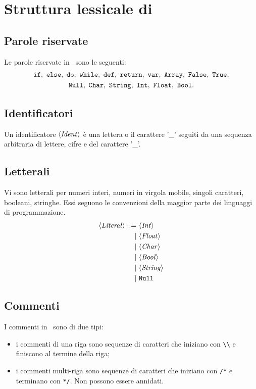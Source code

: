 \section{Struttura lessicale di \SBF}

\subsection*{Parole riservate}
Le parole riservate in \SBF\ sono le seguenti:
\begin{gather*}
\If,\ \Else,\ \Do,\ \While,\ \Def,\ \Return,\ \Var,\ \texttt{Array},\ \False,\ \True,\\
\texttt{Null},\ \texttt{Char},\ \texttt{String},\ \texttt{Int},\ \texttt{Float},\ \texttt{Bool}.
\end{gather*}

\subsection*{Identificatori}

Un identificatore $\langle \mathit{Ident} \rangle$ è una lettera o il carattere '\_' seguiti da una sequenza arbitraria di lettere, cifre e del carattere '\_'.

\subsection*{Letterali}
Vi sono letterali per numeri interi, numeri in virgola mobile, singoli caratteri, booleani, stringhe. Essi seguono le convenzioni della maggior parte dei linguaggi di programmazione.
\begin{align*}
\token{Literal} ::=\ 
& \token{Int}\\
|\ & \token{Float}\\
|\ & \token{Char}\\
|\ & \token{Bool}\\
|\ & \token{String}\\
|\ & \texttt{Null}
\end{align*}

\subsection*{Commenti}
I commenti in \SBF\ sono di due tipi:
\begin{itemize}
	\item i commenti di una riga sono sequenze di caratteri che iniziano con \verb$\\$ e finiscono al termine della riga;
	\item i commenti multi-riga sono sequenze di caratteri che iniziano con \verb$/*$ e terminano con \verb$*/$. Non possono essere annidati.
\end{itemize}

